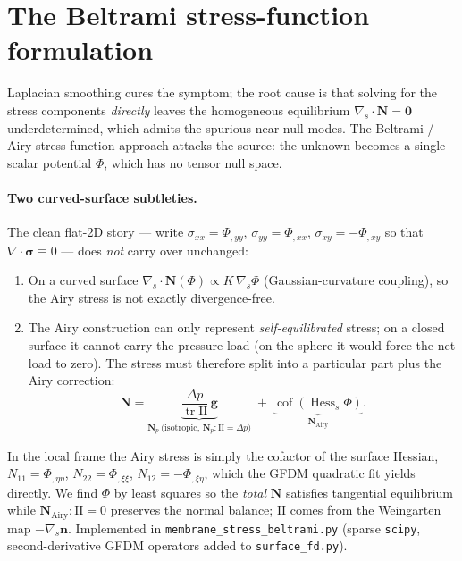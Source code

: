 \documentclass[11pt]{article}
\newcommand{\vv}[1]{\bm{#1}}
\newcommand{\NN}{\mathbf{N}}
\newcommand{\nn}{\vv{n}}
\newcommand{\divs}{\nabla_{\!s}\!\cdot}
\begin{document}
\section{The Beltrami stress-function formulation}\label{sec:beltrami}

Laplacian smoothing cures the symptom; the root cause is that solving for the stress
components \emph{directly} leaves the homogeneous equilibrium $\divs\NN=\vv0$ underdetermined,
which admits the spurious near-null modes. The Beltrami / Airy stress-function approach attacks
the source: the unknown becomes a single scalar potential $\Phi$, which has no tensor null
space.

\paragraph{Two curved-surface subtleties.} The clean flat-2D story --- write
$\sigma_{xx}=\Phi_{,yy}$, $\sigma_{yy}=\Phi_{,xx}$, $\sigma_{xy}=-\Phi_{,xy}$ so that
$\nabla\!\cdot\!\bm\sigma\equiv0$ --- does \emph{not} carry over unchanged:
\begin{enumerate}[noitemsep]
  \item On a curved surface $\divs\NN(\Phi)\propto K\,\nabla_s\Phi$ (Gaussian-curvature
        coupling), so the Airy stress is not exactly divergence-free.
  \item The Airy construction can only represent \emph{self-equilibrated} stress; on a closed
        surface it cannot carry the pressure load (on the sphere it would force the net load to
        zero). The stress must therefore split into a particular part plus the Airy correction:
        \begin{equation}
          \NN = \underbrace{\frac{\Delta p}{\operatorname{tr}\mathrm{I\!I}}\,\mathbf g}_{\NN_p\ \text{(isotropic, }\NN_p:\mathrm{I\!I}=\Delta p\text{)}}
              \;+\; \underbrace{\operatorname{cof}(\operatorname{Hess}_s\Phi)}_{\NN_{\text{Airy}}}.
        \end{equation}
\end{enumerate}
In the local frame the Airy stress is simply the cofactor of the surface Hessian,
$N_{11}=\Phi_{,\eta\eta}$, $N_{22}=\Phi_{,\xi\xi}$, $N_{12}=-\Phi_{,\xi\eta}$, which the GFDM
quadratic fit yields directly. We find $\Phi$ by least squares so the \emph{total} $\NN$
satisfies tangential equilibrium while $\NN_{\text{Airy}}:\mathrm{I\!I}=0$ preserves the normal
balance; $\mathrm{I\!I}$ comes from the Weingarten map $-\nabla_s\nn$. Implemented in
\texttt{membrane\_stress\_beltrami.py} (sparse \texttt{scipy}, second-derivative GFDM operators
added to \texttt{surface\_fd.py}).
\end{document}

